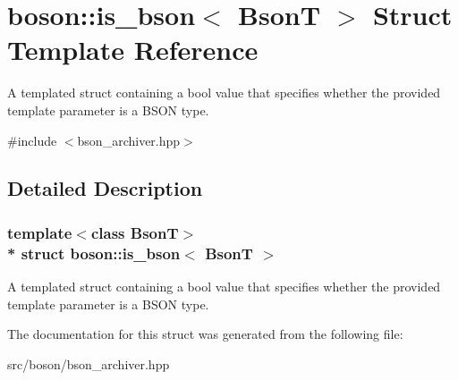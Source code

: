 \hypertarget{structboson_1_1is__bson}{}\section{boson\+:\+:is\+\_\+bson$<$ BsonT $>$ Struct Template Reference}
\label{structboson_1_1is__bson}


A templated struct containing a bool value that specifies whether the provided template parameter is a B\+S\+ON type.  




{\ttfamily \#include $<$bson\+\_\+archiver.\+hpp$>$}



\subsection{Detailed Description}
\subsubsection*{template$<$class BsonT$>$\\*
struct boson\+::is\+\_\+bson$<$ Bson\+T $>$}

A templated struct containing a bool value that specifies whether the provided template parameter is a B\+S\+ON type. 

The documentation for this struct was generated from the following file\+:\begin{DoxyCompactItemize}
\item 
src/boson/bson\+\_\+archiver.\+hpp\end{DoxyCompactItemize}
